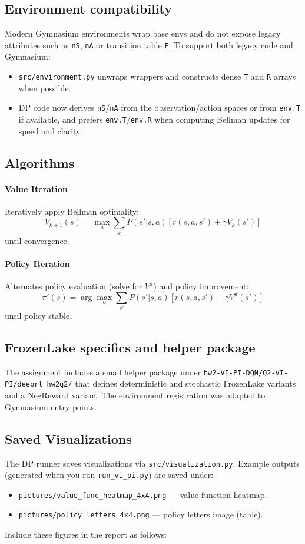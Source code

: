 \documentclass[11pt]{article}
\begin{document}
\subsection{Environment compatibility}
Modern Gymnasium environments wrap base envs and do not expose legacy
attributes such as \texttt{nS}, \texttt{nA} or transition table \texttt{P}.
To support both legacy code and Gymnasium:
\begin{itemize}
  \item \texttt{src/environment.py} unwraps wrappers and constructs dense
    \texttt{T} and \texttt{R} arrays when possible.
  \item DP code now derives \texttt{nS}/\texttt{nA} from the observation/action
    spaces or from \texttt{env.T} if available, and prefers \texttt{env.T}/\texttt{env.R}
    when computing Bellman updates for speed and clarity.
\end{itemize}

\subsection{Algorithms}
\paragraph{Value Iteration}
Iteratively apply Bellman optimality:
\[
V_{k+1}(s) = \max_a \sum_{s'} P(s'|s,a)\left[r(s,a,s') + \gamma V_k(s')\right]
\]
until convergence.

\paragraph{Policy Iteration}
Alternates policy evaluation (solve for \(V^\pi\)) and policy improvement:
\[
\pi'(s) = \arg\max_a \sum_{s'} P(s'|s,a)\left[r(s,a,s') + \gamma V^\pi(s')\right]
\]
until policy stable.

\subsection{FrozenLake specifics and helper package}
The assignment includes a small helper package under
\texttt{hw2-VI-PI-DQN/Q2-VI-PI/deeprl\_hw2q2/} that defines deterministic and
stochastic FrozenLake variants and a NegReward variant. The environment
registration was adapted to Gymnasium entry points.

\subsection{Saved Visualizations}
The DP runner saves visualizations via \texttt{src/visualization.py}. Example
outputs (generated when you run \texttt{run\_vi\_pi.py}) are saved under:
\begin{itemize}
  \item \texttt{pictures/value\_func\_heatmap\_4x4.png} — value function heatmap.
  \item \texttt{pictures/policy\_letters\_4x4.png} — policy letters image (table).
\end{itemize}
Include these figures in the report as follows:
\end{document}
